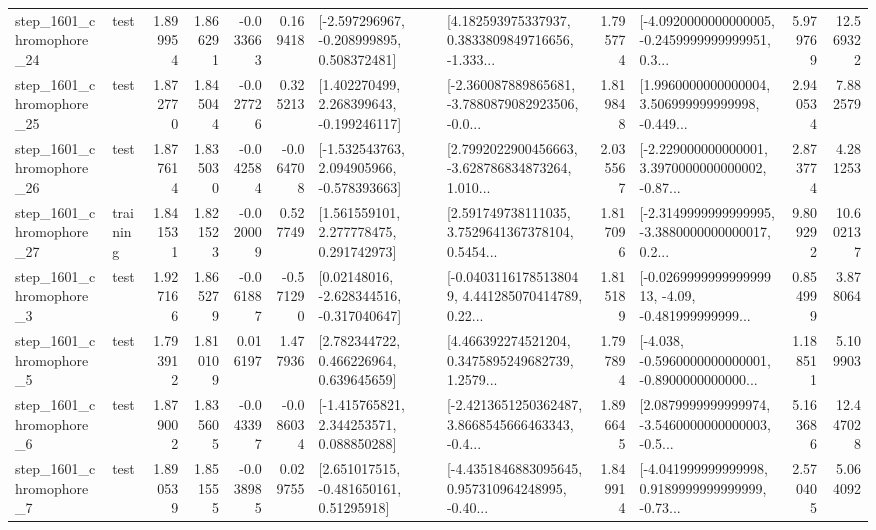 \begin{tabular}{llrrrrllrlrr}
 step\_1601\_chromophore\_24 &      test &      1.899954 &    1.866291 &     -0.033663 &  0.169418 &   [-2.597296967, -0.208999895, 0.508372481] &  [4.182593975337937, 0.3833809849716656, -1.333... &       1.795774 &  [-4.0920000000000005, -0.2459999999999951, 0.3... &            5.979769 &         12.569322 \\
 step\_1601\_chromophore\_25 &      test &      1.872770 &    1.845044 &     -0.027726 &  0.325213 &    [1.402270499, 2.268399643, -0.199246117] &  [-2.360087889865681, -3.7880879082923506, -0.0... &       1.819848 &  [1.9960000000000004, 3.506999999999998, -0.449... &            2.940534 &          7.882579 \\
 step\_1601\_chromophore\_26 &      test &      1.877614 &    1.835030 &     -0.042584 & -0.064708 &   [-1.532543763, 2.094905966, -0.578393663] &  [2.7992022900456663, -3.628786834873264, 1.010... &       2.035567 &  [-2.229000000000001, 3.3970000000000002, -0.87... &            2.873774 &          4.281253 \\
 step\_1601\_chromophore\_27 &  training &      1.841531 &    1.821523 &     -0.020009 &  0.527749 &     [1.561559101, 2.277778475, 0.291742973] &  [2.591749738111035, 3.7529641367378104, 0.5454... &       1.817096 &  [-2.3149999999999995, -3.3880000000000017, 0.2... &            9.809292 &         10.602137 \\
  step\_1601\_chromophore\_3 &      test &      1.927166 &    1.865279 &     -0.061887 & -0.571290 &    [0.02148016, -2.628344516, -0.317040647] &  [-0.04031161785138049, 4.441285070414789, 0.22... &       1.815189 &  [-0.026999999999999913, -4.09, -0.481999999999... &            0.854999 &          3.878064 \\
  step\_1601\_chromophore\_5 &      test &      1.793912 &    1.810109 &      0.016197 &  1.477936 &     [2.782344722, 0.466226964, 0.639645659] &  [4.466392274521204, 0.3475895249682739, 1.2579... &       1.797894 &  [-4.038, -0.5960000000000001, -0.8900000000000... &            1.188511 &          5.109903 \\
  step\_1601\_chromophore\_6 &      test &      1.879002 &    1.835605 &     -0.043397 & -0.086034 &    [-1.415765821, 2.344253571, 0.088850288] &  [-2.4213651250362487, 3.8668545666463343, -0.4... &       1.896645 &  [2.0879999999999974, -3.5460000000000003, -0.5... &            5.163686 &         12.447028 \\
  step\_1601\_chromophore\_7 &      test &      1.890539 &    1.851555 &     -0.038985 &  0.029755 &     [2.651017515, -0.481650161, 0.51295918] &  [-4.4351846883095645, 0.957310964248995, -0.40... &       1.849914 &  [-4.041999999999998, 0.9189999999999999, -0.73... &            2.570405 &          5.064092 \\

\end{tabular}

